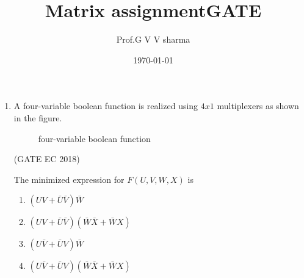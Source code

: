 \documentclass[12pt,-letter paper]{article}
\title{Matrix assignment}
\date{\today}
\author{Prof.G V V sharma}
\providecommand{\brak}[1]{\ensuremath{\left(#1\right)}}
\begin{document}
\title{\textbf{GATE}}
\begin{enumerate}
	\item A four-variable boolean function is realized using $4x1$ multiplexers as shown in the figure.
\begin{figure}[H]
\centering
	
		\caption{four-variable boolean function}
		\label{fig}
	\end{figure}
		\hfill(GATE EC 2018)


 The minimized expression for $F(U,V,W,X)$ is
\begin{enumerate}
\item $\brak{UV+ \bar{U}\bar{V}}\bar{W}$
\item $\brak{UV+ \bar{U}\bar{V}}\brak{\bar{W}\bar{X}+\bar{W}X}$
\item $ \brak{U\bar{V}+\bar{U}V}\bar{W}$
\item $\brak{U\bar{V}+\bar{U}V}\brak{\bar{W}\bar{X}+\bar{W}X}$
\end{enumerate}
\end{enumerate}
\end{document}
